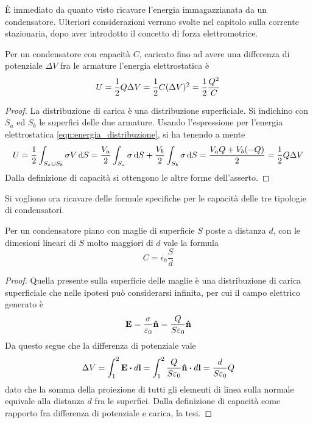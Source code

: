 È immediato da quanto visto ricavare l'energia immagazzianata da un condensatore. Ulteriori considerazioni verrano svolte
nel capitolo sulla corrente stazionaria, dopo aver introdotto il concetto di forza elettromotrice.
\begin{thm}
    Per un condensatore con capacità $C$, caricato fino ad avere una differenza di potenziale $\Delta V$ fra le armature
    l'energia elettrostatica è
    \begin{equation}
        U=\frac{1}{2}Q\Delta V=\frac{1}{2}C(\Delta V)^2=\frac{1}{2}\frac{Q^2}{C}
        \label{eqn:U_condensatore}
    \end{equation}
\end{thm}
\begin{proof}
    La distribuzione di carica è una distribuzione superficiale. Si indichino con $S_a$ ed $S_b$ le superfici delle due armature.
    Usando l'espressione per l'energia elettrostatica \ref{eqn:energia_distribuzione}, si ha
    tenendo a mente
    \[
        U=\frac{1}{2} \int_{S_a \cup S_b} \sigma V \dd{S}=\frac{V_a}{2}\int_{S_a} \sigma\dd{S}+\frac{V_b}{2}\int_{S_b} \sigma\dd{S}=
        \frac{V_a Q + V_b (-Q)}{2}=\frac{1}{2} Q\Delta V
    \]
    Dalla definizione di capacità si ottengono le altre forme dell'asserto.
\end{proof}

Si vogliono ora ricavare delle formule specifiche per le capacità delle tre tipologie di condensatori.
\begin{obs}
    Per un condensatore piano con maglie di superficie $S$ poste a distanza $d$, con le dimesioni lineari di $S$ molto maggiori di $d$ vale la formula
    \begin{equation}
        \label{eqn:capacità_piano}
        C=\epsilon_0\frac{S}{d}
    \end{equation}
\end{obs}
\begin{proof}
    Quella presente sulla superficie delle maglie è una distribuzione di carica superficiale che nelle ipotesi può considerarsi infinita,
    per cui il campo elettrico generato è
    \[
        \vb{E}=\frac{\sigma}{\varepsilon_0}\vu{n}=\frac{Q}{S\varepsilon_0}\vu{n}
    \]
    Da questo segue che la differenza di potenziale vale
    \[
        \Delta V=\int_1^2 \vb{E}\vdot d\vb{l}=\int_1^2\frac{Q}{S\epsilon_0}\vu{n}\vdot d\vb{l}=\frac{d}{S\epsilon_0}Q
    \]
    dato che la somma della proiezione di tutti gli elementi di linea sulla normale equivale alla distanza $d$ fra le superfici.
    Dalla definizione di capacità come rapporto fra differenza di potenziale e carica, la tesi.
\end{proof}

